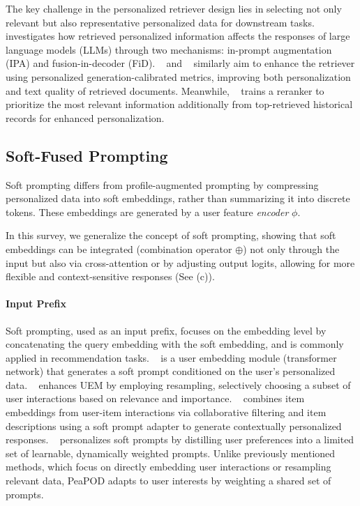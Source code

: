 The key challenge in the personalized retriever design lies in selecting not only relevant but also representative personalized data for downstream tasks. ~\citep{salemi2023lamp} investigates how retrieved personalized information affects the responses of large language models (LLMs) through two mechanisms: in-prompt augmentation (IPA) and fusion-in-decoder (FiD).
~\citep{mysore2023pearl} and ~\citep{salemi2024optimization} similarly aim to enhance the retriever using personalized generation-calibrated metrics, improving both personalization and text quality of retrieved documents.
Meanwhile, ~\citep{zhuang2024hydra} trains a reranker to prioritize the most relevant information additionally from top-retrieved historical records for
enhanced personalization.


\subsection{Soft-Fused Prompting}
\label{subsec:soft}

Soft prompting differs from profile-augmented prompting by compressing personalized data into soft embeddings, rather than summarizing it into discrete tokens.
These embeddings
are generated by a user feature \textit{encoder} $\phi$. 

In this survey, we generalize the concept of soft prompting, showing that soft embeddings can be integrated (combination operator $\oplus$) not only through the input but also via cross-attention or by adjusting output logits, allowing for more flexible and context-sensitive responses (See (c)).


\paragraph{Input Prefix} 
Soft prompting, used as an input prefix, focuses on the embedding level by concatenating the query embedding with the soft embedding, and is commonly applied in recommendation tasks.
~\citep{doddapaneni2024user} is a user embedding module (transformer network) that generates a soft prompt conditioned on the user's personalized data. 
~\citep{hebert2024persoma} enhances UEM by employing resampling, selectively choosing a subset of user interactions based on relevance and importance. 
~\citep{sayana2024beyond} combines item embeddings from user-item interactions via collaborative filtering and item descriptions using a soft prompt adapter to generate contextually personalized responses.
~\citep{ramos2024preference} personalizes soft prompts by distilling user preferences into a limited set of learnable, dynamically weighted prompts. Unlike previously mentioned methods, which focus on directly embedding user interactions or resampling relevant data, PeaPOD adapts to user interests by weighting a shared set of prompts. 


